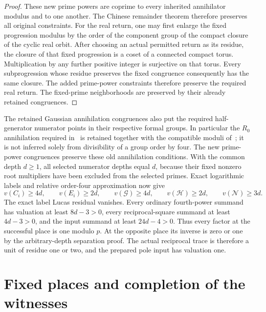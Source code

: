 \documentclass[11pt,a4paper]{article}
\begin{document}
\begin{proof}
These new prime powers are coprime to every inherited annihilator
modulus and to one another. The Chinese remainder theorem therefore
preserves all original constraints. For the real return, one may first
enlarge the fixed progression modulus by the order of the component
group of the compact closure of the cyclic real orbit. After choosing
an actual permitted return as its residue, the closure of that fixed
progression is a coset of a connected compact torus. Multiplication by
any further positive integer is surjective on that torus. Every
subprogression whose residue preserves the fixed congruence consequently
has the same closure. The added prime-power constraints therefore
preserve the required real return. The fixed-prime neighborhoods are
preserved by their already retained congruences.
\end{proof}

The retained Gaussian annihilation congruences also put the required
half-generator numerator points in their respective formal groups.
In particular the $R_0$ annihilation required in~\cite{InverseVieta}
is retained together with the compatible moduli of~\cite[P16]{Uniform};
it is not inferred solely from divisibility of a group order by four.
The new prime-power congruences preserve these old annihilation
conditions. With the common depth $d\ge1$, all selected numerator depths equal
$d$, because their fixed nonzero root multipliers have been excluded
from the selected primes. Exact logarithmic labels and relative
order-four approximation now give
\[
 v(C_i)\ge4d,\qquad v(E_i)\ge2d,
 \qquad v(\mathcal G)\ge4d,\qquad v(\mathcal H)\ge2d,
 \qquad v(\mathcal N)\ge3d.
\]
The exact label Lucas residual vanishes. Every ordinary fourth-power
summand has valuation at least $8d-3>0$, every reciprocal-square
summand at least $4d-3>0$, and the input summand at least $24d-4>0$.
Thus every factor at the successful place is one modulo $p$.
At the opposite place its inverse is zero or one by the arbitrary-depth
separation proof. The actual reciprocal trace is therefore a unit of
residue one or two, and the prepared pole input has valuation one.

\section{Fixed places and completion of the witnesses}
\end{document}

